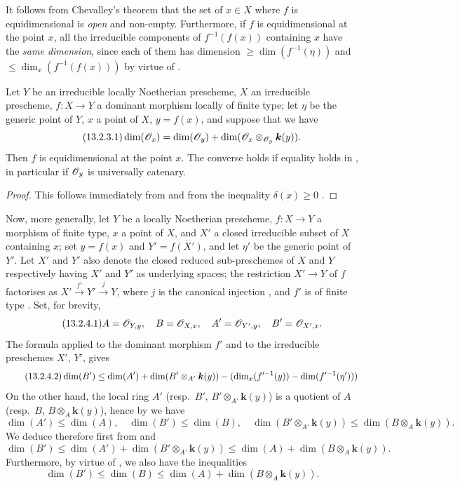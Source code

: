 It follows from Chevalley's theorem  that the set of $x\in X$ where $f$ is equidimensional is \emph{open} and non-empty.
Furthermore, if $f$ is equidimensional at the point $x$, all the irreducible components of $f^{-1}(f(x))$ containing $x$ have the \emph{same dimension}, since each of them has dimension $\geq\dim(f^{-1}(\eta))$  and $\leq\dim_x(f^{-1}(f(x)))$ by virtue of .

\begin{proposition}[13.2.3]
\label{IV.13.2.3}
Let $Y$ be an irreducible locally Noetherian prescheme, $X$ an irreducible prescheme, $f:X\to Y$ a \textup{dominant} morphism locally of finite type; let $\eta$ be the generic point of $Y$, $x$ a point of $X$, $y=f(x)$, and suppose that we have
\[
\label{IV.13.2.3.1}
\tag{13.2.3.1}
  \dim(\mathscr{O}_x)=\dim(\mathscr{O}_y)+\dim(\mathscr{O}_x\otimes_{\mathscr{O}_y}\boldsymbol{k}(y)).
\]
Then $f$ is equidimensional at the point $x$.
The converse holds if equality holds in , in particular if $\mathscr{O}_y$ is universally catenary.
\end{proposition}

\begin{proof}
This follows immediately from  and from the inequality $\delta(x)\geq 0$ .
\end{proof}

\begin{env}[13.2.4]
\label{IV.13.2.4}
Now, more generally, let $Y$ be a locally Noetherian prescheme, $f:X\to Y$ a morphism of finite type, $x$ a point of $X$, and $X'$ a closed irreducible subset of $X$ containing $x$; set $y=f(x)$ and $Y'=\overline{f(X')}$, and let $\eta'$ be the generic point of $Y'$.
Let $X'$ and $Y'$ also denote the closed reduced sub-preschemes of $X$ and $Y$ respectively having $X'$ and $Y'$ as underlying spaces; the restriction $X'\to Y$ of $f$ factorises as $X'\xrightarrow{f'}Y'\xrightarrow{j}Y$, where $j$ is the canonical injection , and $f'$ is of finite type .
Set, for brevity,
\[
\label{IV.13.2.4.1}
\tag{13.2.4.1}
  A=\mathscr{O}_{Y,y},\quad B=\mathscr{O}_{X,x},\quad A'=\mathscr{O}_{Y',y},\quad B'=\mathscr{O}_{X',x}.
\]
The formula  applied to the dominant morphism $f'$ and to the irreducible preschemes $X'$, $Y'$, gives
\[
\label{IV.13.2.4.2}
\tag{13.2.4.2}
  \dim(B')\leq\dim(A')+\dim(B'\otimes_{A'}\boldsymbol{k}(y))-(\dim_x(f'^{-1}(y))-\dim(f'^{-1}(\eta')))
\]
On the other hand, the local ring $A'$ (resp.\ $B'$, $B'\otimes_{A'}\boldsymbol{k}(y)$) is a quotient of $A$ (resp.\ $B$, $B\otimes_A\boldsymbol{k}(y)$), hence by  we have
\[
\tag{13.2.4.3}
\label{IV.13.2.4.3}
  \dim(A')\leq\dim(A),\quad \dim(B')\leq\dim(B),\quad \dim(B'\otimes_{A'}\boldsymbol{k}(y))\leq\dim(B\otimes_A\boldsymbol{k}(y)).
\]
We deduce therefore first from  and 
\[
\label{IV.13.2.4.4}
\tag{13.2.4.4}
  \dim(B')\leq\dim(A')+\dim(B'\otimes_{A'}\boldsymbol{k}(y))\leq\dim(A)+\dim(B\otimes_A\boldsymbol{k}(y)).
\]
Furthermore, by virtue of , we also have the inequalities
\[
\label{IV.13.2.4.5}
\tag{13.2.4.5}
  \dim(B')\leq\dim(B)\leq\dim(A)+\dim(B\otimes_A\boldsymbol{k}(y)).
\]
\end{env}


